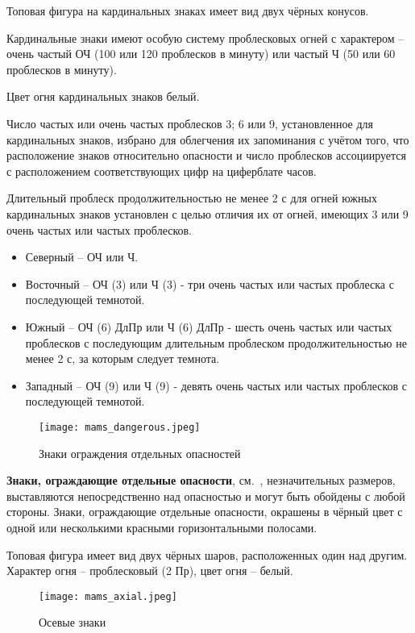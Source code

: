 Топовая фигура на кардинальных знаках имеет вид двух чёрных конусов.

Кардинальные знаки имеют особую систему проблесковых огней с
характером \--- очень частый ОЧ (100 или 120 проблесков в минуту) или
частый Ч (50 или 60 проблесков в минуту).

Цвет огня кардинальных знаков белый.

Число частых или очень частых проблесков 3; 6 или 9, установленное для
кардинальных знаков, избрано для облегчения их запоминания с учётом
того, что расположение знаков относительно опасности и число
проблесков ассоциируется с расположением соответствующих цифр на
циферблате часов.

Длительный проблеск продолжительностью не менее 2 с для огней южных
кардинальных знаков установлен с целью отличия их от огней, имеющих 3
или 9 очень частых или частых проблесков.

\begin{itemize}
\item Северный \--- ОЧ или Ч.
\item Восточный \--- ОЧ (3) или Ч (3) - три очень частых или частых
  проблеска с последующей темнотой.
\item Южный \--- ОЧ (6) ДлПр или Ч (6) ДлПр - шесть очень частых или
  частых проблесков с последующим длительным проблеском
  продолжительностью не менее 2 с, за которым следует темнота.
\item Западный \--- ОЧ (9) или Ч (9) - девять очень частых или частых
  проблесков с последующей темнотой.
\end{itemize}

\begin{figure}[htb]
  \centering{}
  \texttt{[image: mams\_dangerous.jpeg]}
  \caption{Знаки ограждения отдельных опасностей}
  \label{fig:mams-dangerous}
\end{figure}

\textbf{Знаки, ограждающие отдельные опасности},
см.~, незначительных размеров, выставляются
непосредственно над опасностью и могут быть обойдены с любой
стороны. Знаки, ограждающие отдельные опасности, окрашены в чёрный
цвет с одной или несколькими красными горизонтальными полосами.

Топовая фигура имеет вид двух чёрных шаров, расположенных один над
другим. Характер огня \--- проблесковый (2 Пр), цвет огня \--- белый.

\begin{figure}[htb]
  \centering{}
  \texttt{[image: mams\_axial.jpeg]}
  \caption{Осевые знаки}
  \label{fig:mams-axial}
\end{figure}

